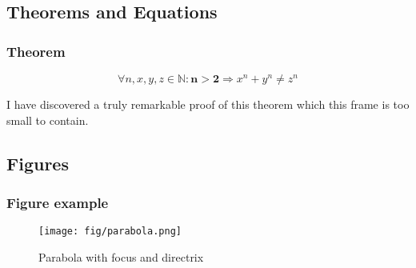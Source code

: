 \documentclass[aspectratio=169]{beamer}
\begin{document}
\subsection{Theorems and Equations}


\begin{frame}
\frametitle{Theorem}
\begin{theorem}
\begin{equation}
    \forall n, x, y, z \in \mathbb{N}: \mathbf{n > 2} \Rightarrow x^n + y^n \neq z^n
\end{equation}
\end{theorem}
I have discovered a truly remarkable proof of this theorem which this frame is too small to contain.
\end{frame}


\subsection{Figures}


\begin{frame}
\frametitle{Figure example}
\begin{figure}
    \texttt{[image: fig/parabola.png]}
    \caption{Parabola with focus and directrix}
\end{figure}
\end{frame}


\end{document}
